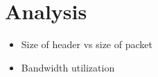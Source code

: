 \section{Analysis}

\begin{itemize}
    \item Size of header vs size of packet
    \item Bandwidth utilization
\end{itemize}